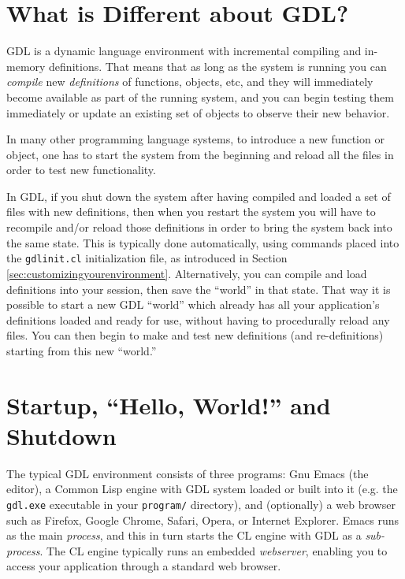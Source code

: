 \documentclass [11pt]{book}
\begin{document}
\section{What is Different about GDL?}

\label{sec:whatisdifferentaboutgdl?}

GDL is a dynamic language environment with incremental
compiling and in-memory definitions. That means that as long as the
system is running you can \emph{compile} new \emph{definitions} of functions, objects, etc, and they will immediately become
available as part of the running system, and you can begin testing
them immediately or update an existing set of objects to observe their
new behavior.

In many other programming language systems, to introduce a new
function or object, one has to start the system from the beginning and
reload all the files in order to test new functionality.
 
In GDL, if you shut down the system after having compiled and loaded a
set of files with new definitions, then when you restart the system
you will have to recompile and/or reload those definitions in order to
bring the system back into the same state. This is typically done
automatically, using commands placed into the \texttt{gdlinit.cl} initialization file, as introduced in Section 
\ref{sec:customizingyourenvironment}. Alternatively, you can compile and load definitions into
your session, then save the ``world'' in that state. That way it is
possible to start a new GDL ``world'' which already has all your
application's definitions loaded and ready for use, without having to
procedurally reload any files. You can then begin to make and test new
definitions (and re-definitions) starting from this new ``world.''

\section{Startup, ``Hello, World!'' and Shutdown}

\label{sec:startup,hello,world!andshutdown}



The typical GDL environment consists of three programs: Gnu
Emacs (the editor), a Common Lisp engine with GDL system loaded or built into it (e.g. the \texttt{gdl.exe} executable in your \texttt{program/} directory), and (optionally) a web browser
such as Firefox, Google Chrome, Safari, Opera, or Internet
Explorer. Emacs runs as the main \emph{process}, and this in turn starts the CL engine with GDL as a \emph{sub-process}. The CL engine typically runs an embedded \emph{webserver}, enabling you to access your application through a standard web browser.
\end{document}

